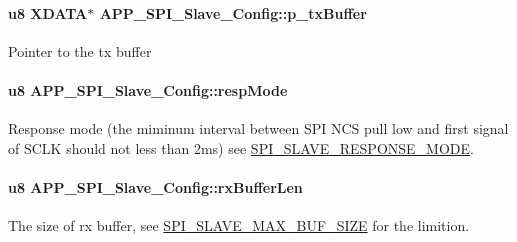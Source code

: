 \paragraph[{\texorpdfstring{p\+\_\+tx\+Buffer}{p_txBuffer}}]{\setlength{\rightskip}{0pt plus 5cm}u8 X\+D\+A\+TA$\ast$ A\+P\+P\+\_\+\+S\+P\+I\+\_\+\+Slave\+\_\+\+Config\+::p\+\_\+tx\+Buffer}\hypertarget{struct_a_p_p___s_p_i___slave___config_a467491e014e2b19dbe625dfb338e9f16}{}\label{struct_a_p_p___s_p_i___slave___config_a467491e014e2b19dbe625dfb338e9f16}
Pointer to the tx buffer 
\paragraph[{\texorpdfstring{resp\+Mode}{respMode}}]{\setlength{\rightskip}{0pt plus 5cm}u8 A\+P\+P\+\_\+\+S\+P\+I\+\_\+\+Slave\+\_\+\+Config\+::resp\+Mode}\hypertarget{struct_a_p_p___s_p_i___slave___config_ab6dd24452cc1f01d12b37d79421c5bbf}{}\label{struct_a_p_p___s_p_i___slave___config_ab6dd24452cc1f01d12b37d79421c5bbf}
Response mode (the miminum interval between S\+PI N\+CS pull low and first signal of S\+C\+LK should not less than 2ms) see \hyperlink{group___s_p_i___s_l_a_v_e___r_e_s_p_o_n_s_e___m_o_d_e}{S\+P\+I\+\_\+\+S\+L\+A\+V\+E\+\_\+\+R\+E\+S\+P\+O\+N\+S\+E\+\_\+\+M\+O\+DE}. 
\paragraph[{\texorpdfstring{rx\+Buffer\+Len}{rxBufferLen}}]{\setlength{\rightskip}{0pt plus 5cm}u8 A\+P\+P\+\_\+\+S\+P\+I\+\_\+\+Slave\+\_\+\+Config\+::rx\+Buffer\+Len}\hypertarget{struct_a_p_p___s_p_i___slave___config_a6b461b7c3aebf881e2fe2f2d867b2538}{}\label{struct_a_p_p___s_p_i___slave___config_a6b461b7c3aebf881e2fe2f2d867b2538}
The size of rx buffer, see \hyperlink{group___s_p_i___s_l_a_v_e___m_a_x___b_u_f___s_i_z_e}{S\+P\+I\+\_\+\+S\+L\+A\+V\+E\+\_\+\+M\+A\+X\+\_\+\+B\+U\+F\+\_\+\+S\+I\+ZE} for the limition. 

